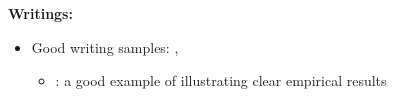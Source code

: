 \documentclass{book}
\theoremstyle{plain}
\theoremstyle{definition}
\begin{document}
\vspace{1em}
\noindent
\textbf{Writings:}
\begin{itemize}
	\item Good writing samples: \cite{Berry:1992gl}, \cite{doi:10.3982/ECTA7699}
	\begin{itemize}
		\item \cite{doi:10.3982/ECTA7699}: a good example of illustrating clear empirical results
	\end{itemize}
\end{itemize}




\renewcommand\refname{Reference}


\end{document}
